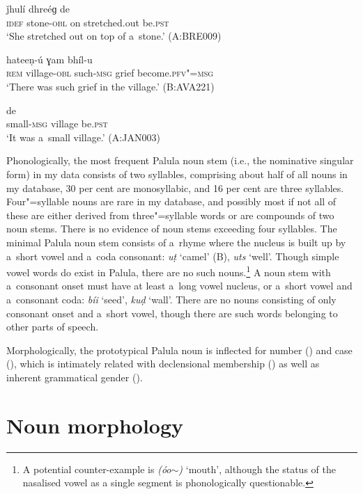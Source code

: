 \begin{exe}
\ex
\label{ex:4-4}
\gll [áa baṭ-á] ǰhulí dhreéɡ de \\ 
\textsc{idef} stone-\textsc{obl} on stretched.out be.\textsc{pst} \\
\glt `She stretched out on top of a~stone.' (A:BRE009)

\ex
\label{ex:4-5}
 hateeṇ-ú ɣam bhíl-u \\
	\textsc{rem} village-\textsc{obl} such-\textsc{msg} grief become.\textsc{pfv"=msg} \\
\glt `There was such grief in the village.' (B:AVA221)

\ex
\label{ex:4-5b}
 de \\
small-\textsc{msg} village be.\textsc{pst} \\
\glt `It was a~small village.' (A:JAN003)
\end{exe}


Phonologically, the most frequent Palula noun stem (i.e., the nominative singular form) in my data consists of two syllables, comprising about half of all nouns in my database, 30 per cent are monosyllabic, and 16 per cent are three syllables. Four"=syllable nouns are rare in my database, and possibly most if not all of these are either derived from three"=syllable words or are compounds of two noun stems. There is no evidence of noun stems exceeding four syllables. The minimal Palula noun stem consists of a~rhyme where the nucleus is built up by a~short vowel and a~coda consonant: \textit{uṭ} `camel' (B), \textit{uts} `well'. Though simple vowel words do exist in Palula, there are no such nouns.\footnote{A potential counter-example is \textit{(óo$\sim$)} `mouth', although the status of the nasalised vowel as a single segment is phonologically questionable.} A noun stem with a~consonant onset must have at least a~long vowel nucleus, or a~short vowel and a~consonant coda: \textit{bíi} `seed', \textit{kuḍ} `wall'. There are no nouns consisting of only consonant onset and a~short vowel, though there are such words belonging to other parts of speech.


Morphologically, the prototypical Palula noun is inflected for number () and case (), which is intimately related with declensional membership () as well as inherent grammatical gender (). 


\section{Noun morphology}
\label{sec:4-2}

